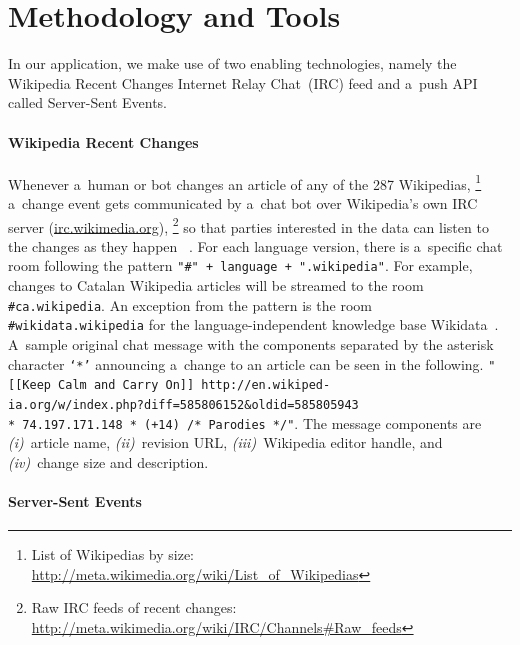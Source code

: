 \documentclass{sig-alternate}
\newcommand{\inlinelistingsize}{\fontsize{8pt}{11pt}}
\let\oldurl\url
\renewcommand{\url}[1]{\inlinelistingsize\oldurl{#1}}
\begin{document}
\section{Methodology and Tools}

In our application, we make use of two enabling technologies,
namely the Wikipedia Recent Changes Internet Relay Chat~(IRC) feed
and a~push API called Server-Sent Events.

\paragraph{Wikipedia Recent Changes}
\label{sec:wikipedia-recent-changes}

Whenever a~human or bot changes an article
of any of the 287 Wikipedias,%
\footnote{List of Wikipedias by size:
\url{http://meta.wikimedia.org/wiki/List_of_Wikipedias}}
a~change event gets communicated by a~chat bot
over Wikipedia's own IRC server (\url{irc.wikimedia.org}),%
\footnote{Raw IRC feeds of recent changes:
\url{http://meta.wikimedia.org/wiki/IRC/Channels\#Raw_feeds}}
so that parties interested in the data
can listen to the changes as they happen%
~\cite{steiner2013mjnomore}.
For each language version, there is
a~specific chat room following the pattern
\texttt{"\#" + language + ".wikipedia"}.
For example, changes to Catalan Wikipedia articles
will be streamed to the room \texttt{\#ca.wikipedia}.
An exception from the pattern is the room
\texttt{\#wikidata.wikipedia} for the language-independent
knowledge base Wikidata~\cite{vrandecic2012wikidata}.
A~sample original chat message with the components separated
by the asterisk character \texttt{`*'}
announcing a~change to an article
can be seen in the following.
\texttt{"[[Keep Calm and Carry On]] http://en.wikiped-\\ ia.org/w/index.php?diff=585806152\&oldid=585805943 \\* 74.197.171.148 * (+14) /* Parodies */"}.
The message components are \emph{(i)}~article name, \emph{(ii)}~revision URL,
\emph{(iii)}~Wiki\-pedia editor handle, and
\emph{(iv)}~change size and description.

\paragraph{Server-Sent Events}
\end{document}
